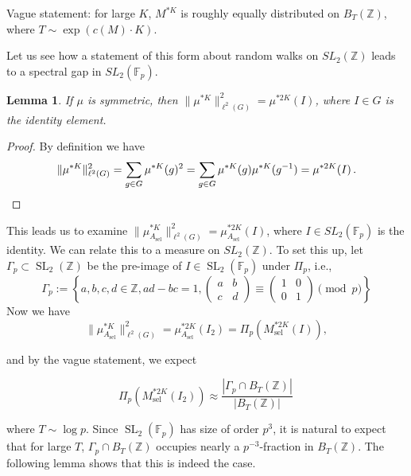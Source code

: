 \documentclass[12pt]{amsart}
\newtheorem{lemma}[theorem]{Lemma}
\newcommand{\F}{\mathbb{F}}
\newcommand{\FF}{\mathbb{F}}
\newcommand{\ZZ}{\mathbb{Z}}
\begin{document}
Vague statement: for large $K$, $M^{\ast K}$ is roughly equally distributed on $B_T(\ZZ)$, where $T\sim \exp(c(M)\cdot K)$.    

Let us see how a statement of this form about random walks on $SL_2(\ZZ)$ leads to a spectral gap in $SL_2(\FF_p)$.  

\begin{lemma}\label{lem-B_T}
    If $\mu$ is symmetric, then $\|\mu^{\ast K}\|_{\ell^2(G)}^2=\mu^{\ast 2K}(I)$, where $I \in G$ is the identity element.  
\end{lemma}
\begin{proof}
    By definition we have
    \[
    \|\mu^{\ast K}\|_{\ell^2(G)}^2=\sum_{g\in G}\mu^{\ast K}(g)^2=\sum_{g\in G}\mu^{\ast K}(g)\mu^{\ast K}(g^{-1})=\mu^{\ast 2K}(I)\,.\qedhere
    \]
\end{proof}

This leads us to examine $\|\mu_{A_{\operatorname{sel}}}^{\ast K}\|_{\ell^2(G)}^2=\mu_{A_{\operatorname{sel}}}^{\ast 2K}(I)$,  where $I \in SL_2(\FF_p)$ is the identity.   We can relate this to a measure on $SL_2(\ZZ)$.   To set this up,  let $\Gamma_p\subset\operatorname{SL}_2(\ZZ)$ be the pre-image of $I \in \operatorname{SL}_2(\F_p)$ under $\Pi_p$, i.e.,
\[
\Gamma_p:=\left\{a,b,c,d\in \ZZ,ad-bc=1,\left(\begin{matrix}
    a&b\\
    c&d
\end{matrix}\right)\equiv \left(\begin{matrix}
    1&0\\
    0&1
\end{matrix}\right)\pmod p\right\}
\]
Now we have 
\[
\|\mu_{A_{\operatorname{sel}}}^{\ast K}\|_{\ell^2(G)}^2=\mu_{A_{\operatorname{sel}}}^{\ast 2K}(I_2)=\Pi_p(M_{\operatorname{sel}}^{\ast 2K}(I)),
\]

and by the vague statement,  we expect

\[
\Pi_p(M_{\operatorname{sel}}^{\ast 2K}(I_2))\approx \frac{|\Gamma_p\cap B_T(\ZZ)|}{|B_T(\ZZ)|}\,
\]

\noindent where $T \sim \log p$.  Since $\operatorname{SL}_2(\F_p)$ has size of order $p^3$, it is natural to expect that for large $T$, $\Gamma_p\cap B_T(\ZZ)$ occupies nearly a $p^{-3}$-fraction in $B_T(\ZZ)$. The following lemma shows that this is indeed the case.
\end{document}
